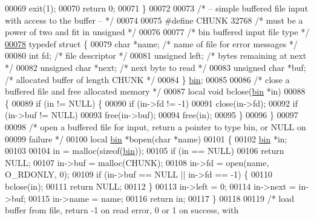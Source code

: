 \begin{DoxyCode}
{00069     exit(1);
00070     \textcolor{keywordflow}{return} 0;
00071 \}
00072 
00073 \textcolor{comment}{/* -- simple buffered file input with access to the buffer -- */}
00074 
00075 \textcolor{preprocessor}{#define CHUNK 32768         }\textcolor{comment}{/* must be a power of two and fit in unsigned */}\textcolor{preprocessor}{}
00076 
00077 \textcolor{comment}{/* bin buffered input file type */}
\hyperlink{structbin}{00078} \textcolor{keyword}{typedef} \textcolor{keyword}{struct }\{
00079     \textcolor{keywordtype}{char} *name;             \textcolor{comment}{/* name of file for error messages */}
00080     \textcolor{keywordtype}{int} fd;                 \textcolor{comment}{/* file descriptor */}
00081     \textcolor{keywordtype}{unsigned} left;          \textcolor{comment}{/* bytes remaining at next */}
00082     \textcolor{keywordtype}{unsigned} \textcolor{keywordtype}{char} *next;    \textcolor{comment}{/* next byte to read */}
00083     \textcolor{keywordtype}{unsigned} \textcolor{keywordtype}{char} *buf;     \textcolor{comment}{/* allocated buffer of length CHUNK */}
00084 \} \hyperlink{structbin}{bin};
00085 
00086 \textcolor{comment}{/* close a buffered file and free allocated memory */}
00087 local \textcolor{keywordtype}{void} bclose(\hyperlink{structbin}{bin} *in)
00088 \{
00089     \textcolor{keywordflow}{if} (in != NULL) \{
00090         \textcolor{keywordflow}{if} (in->fd != -1)
00091             close(in->fd);
00092         \textcolor{keywordflow}{if} (in->buf != NULL)
00093             free(in->buf);
00094         free(in);
00095     \}
00096 \}
00097 
00098 \textcolor{comment}{/* open a buffered file for input, return a pointer to type bin, or NULL on}
00099 \textcolor{comment}{   failure */}
00100 local \hyperlink{structbin}{bin} *bopen(\textcolor{keywordtype}{char} *name)
00101 \{
00102     \hyperlink{structbin}{bin} *in;
00103 
00104     in = malloc(\textcolor{keyword}{sizeof}(\hyperlink{structbin}{bin}));
00105     \textcolor{keywordflow}{if} (in == NULL)
00106         \textcolor{keywordflow}{return} NULL;
00107     in->buf = malloc(CHUNK);
00108     in->fd = open(name, O\_RDONLY, 0);
00109     \textcolor{keywordflow}{if} (in->buf == NULL || in->fd == -1) \{
00110         bclose(in);
00111         \textcolor{keywordflow}{return} NULL;
00112     \}
00113     in->left = 0;
00114     in->next = in->buf;
00115     in->name = name;
00116     \textcolor{keywordflow}{return} in;
00117 \}
00118 
00119 \textcolor{comment}{/* load buffer from file, return -1 on read error, 0 or 1 on success, with}
}
\end{DoxyCode}
